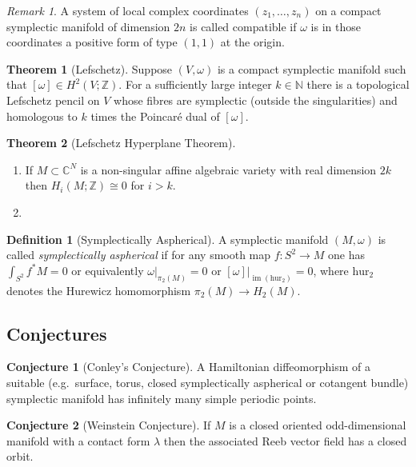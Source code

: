 \documentclass[a4paper]{article}
\newcommand{\CC}{\mathbb{C}}
\newcommand{\ZZ}{\mathbb{Z}}
\newcommand{\NN}{\mathbb{N}}
\newcommand{\lra}{\longrightarrow}
\theoremstyle{definition}
\newtheorem{thm}{Theorem}
\newtheorem{conjecture}{Conjecture}
\theoremstyle{definition}
\newtheorem{definition}{Definition}
\theoremstyle{remark}
\newtheorem{rmk}{Remark}
\theoremstyle{remark}
\begin{document}
\begin{rmk}
  A system of local complex coordinates $(z_1,\ldots,z_n)$ on a compact symplectic manifold of dimension $2n$ is called compatible if $\omega$ is in those coordinates a positive form of type $(1,1)$ at the origin.
\end{rmk}

\begin{thm}[Lefschetz]
  Suppose $(V,\omega)$ is a compact symplectic manifold such that $[\omega]\in H^2(V;\ZZ)$. For a sufficiently large integer $k\in\NN$ there is a topological Lefschetz pencil on $V$ whose fibres are symplectic (outside the singularities) and homologous to $k$ times the Poincar\'e dual of $[\omega]$.
\end{thm}

\begin{thm}[Lefschetz Hyperplane Theorem]
  \begin{enumerate}
    \item If $M\subset\CC^N$ is a non-singular affine algebraic variety with real dimension $2k$ then $H_i(M;\ZZ)\cong 0$ for $i>k$.
    \item
  \end{enumerate}
\end{thm}

\begin{definition}[Symplectically Aspherical]
  A symplectic manifold $(M,\omega)$ is called \emph{symplectically aspherical} if for any smooth map $f:S^2\lra M$ one has $\int_{S^2}f^*M=0$ or equivalently $\omega|_{\pi_2(M)}=0$ or $[\omega]|_{\operatorname{im}(\text{hur}_2)}=0$, where $\text{hur}_2$ denotes the Hurewicz homomorphism $\pi_2(M)\lra H_2(M)$.
\end{definition}

\subsection{Conjectures}

\begin{conjecture}[Conley's Conjecture]
  A Hamiltonian diffeomorphism of a suitable (e.g.\ surface, torus, closed symplectically aspherical or cotangent bundle) symplectic manifold has infinitely many simple periodic points.
\end{conjecture}

\begin{conjecture}[Weinstein Conjecture]
  If $M$ is a closed oriented odd-dimensional manifold with a contact form $\lambda$ then the associated Reeb vector field has a closed orbit.
\end{conjecture}
\end{document}
